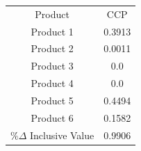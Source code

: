 \begin{tabular}{cc}
Product & CCP \\
Product 1 & 0.3913 \\
Product 2 & 0.0011 \\
Product 3 & 0.0 \\
Product 4 & 0.0 \\
Product 5 & 0.4494 \\
Product 6 & 0.1582 \\
$\%\Delta$ Inclusive Value & 0.9906 \\
\end{tabular}